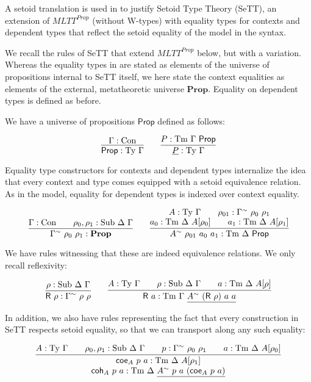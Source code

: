 \documentclass{easychair}
\newcommand{\GG}{\Gamma}
\newcommand{\DD}{\Delta}
\newcommand{\GD}{\Delta}
\newcommand{\coe}{\textsf{coe}}
\newcommand{\coh}{\textsf{coh}}
\newcommand{\tyj}[2]{#2 : \Ty\ #1}
\newcommand{\tmj}[3]{#2 : \Tm\ #1\ #3}
\newcommand{\subj}[3]{#1 : \mathrm{Sub}\ #2\ #3}
\newcommand{\Prop}{\textsf{Prop}}
\newcommand{\mProp}{\mathbf{Prop}}
\newcommand{\Con}{\mathrm{Con}}
\newcommand{\Ty}{\mathrm{Ty}}
\newcommand{\Tm}{\mathrm{Tm}}
\newcommand{\Sub}{\mathrm{Sub}}
\newcommand{\metaprop}{\mathbf{Prop}}
\begin{document}
A setoid translation is used in \cite{mpc19} to justify Setoid Type Theory
(SeTT), an extension of $MLTT^{Prop}$ (without W-types) with equality types for
contexts and dependent types that reflect the setoid equality of the model in
the syntax.

We recall the rules of SeTT that extend $MLTT^{Prop}$ below, but with a
variation. Whereas the equality types in \cite{mpc19} are stated as elements of
the universe of propositions internal to SeTT itself, we here state the context
equalities as elements of the external, metatheoretic universe
$\mProp$. Equality on dependent types is defined as before.

We have a universe of propositions $\Prop$ defined as follows:

\[
\infer{
  \Prop : \Ty\ \GG
}{
  \GG : \Con
}
\qquad
\infer{
  \underline{P} : \Ty\ \GG
}{
  P : \Tm\ \GG\ \Prop
}
\]

Equality type constructors for contexts and dependent types internalize the idea
that every context and type comes equipped with a setoid equivalence
relation. As in the model, equality for dependent types is indexed over context
equality.

\[
\infer{
  \GG^\sim\ \rho_0\ \rho_1 : \metaprop
}{
  \GG : \Con \qquad \subj{\rho_0, \rho_1}{\DD}{\GG}
}
\qquad
\infer{
  A^{\sim}\ \rho_{01}\ a_0\ a_1 : \Tm\ \DD\ \Prop
}{
  \deduce{
    a_0 : \Tm\ \DD\ A[\rho_0] \qquad a_1 : \Tm\ \DD\ A[\rho_1]
  }{
    A : \Ty\ \GG \qquad \rho_{01} : \GG^{\sim}\ \rho_0\ \rho_1
  }
}
\]

We have rules witnessing that these are indeed equivalence relations. We only
recall reflexivity:

\[
\infer{
  \textsf{R}\ \rho : \GG^\sim\ \rho\ \rho
}{
  \rho : \Sub\ \GD\ \GG
}
\qquad
\infer{
  \textsf{R}\ a : \Tm\ \GG\ \underline{A^\sim\ (\textsf{R}\ \rho)\ a\ a}
}{
  A : \Ty\ \GG
  \qquad
  \rho : \Sub\ \GD\ \GG
  \qquad
  a : \Tm\ \GD\ A[\rho]
}
\]

In addition, we also have rules representing the fact that every construction in
SeTT respects setoid equality, so that we can transport along any such equality:

    \[
    \infer{
      \deduce{
        \tmj{\GD}{\coh_A\ p\ a}{\underline{A^\sim\ p\ a\ (\coe_A\ p\ a)}}
      }{
        \tmj{\GD}{\coe_A\ p\ a}{A[\rho_1]}
      }
    }{
      \tyj{\GG}{A} \qquad \subj{\rho_0, \rho_1}{\GD}{\GG} \qquad
      p : \GG^\sim\ \rho_0\ \rho_1\qquad
      \tmj{\GD}{a}{A[\rho_0]}
    }
    \]
\end{document}
